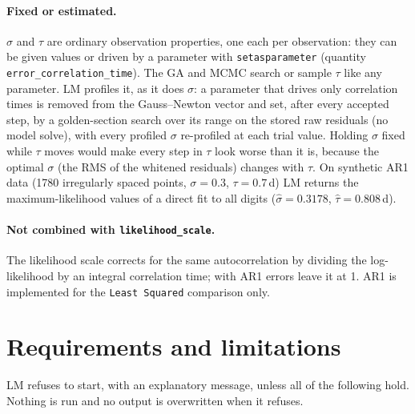 \documentclass[11pt,a4paper]{article}
\newcommand{\code}[1]{\texttt{\small #1}}
\begin{document}
\paragraph{Fixed or estimated.} $\sigma$ and $\tau$ are ordinary observation
properties, one each per observation: they can be given values or driven by a
parameter with \code{setasparameter} (quantity \code{error\_correlation\_time}).
The GA and MCMC search or sample $\tau$ like any parameter. LM profiles it, as it
does $\sigma$: a parameter that drives only correlation times is removed from the
Gauss--Newton vector and set, after every accepted step, by a golden-section
search over its range on the stored raw residuals (no model solve), with every
profiled $\sigma$ re-profiled at each trial value. Holding $\sigma$ fixed while
$\tau$ moves would make every step in $\tau$ look worse than it is, because the
optimal $\sigma$ (the RMS of the whitened residuals) changes with $\tau$. On
synthetic AR1 data (1780 irregularly spaced points, $\sigma=0.3$, $\tau=0.7$\,d)
LM returns the maximum-likelihood values of a direct fit to all digits
($\hat\sigma=0.3178$, $\hat\tau=0.808$\,d).

\paragraph{Not combined with \code{likelihood\_scale}.} The likelihood scale
corrects for the same autocorrelation by dividing the log-likelihood by an
integral correlation time; with AR1 errors leave it at 1. AR1 is implemented for
the \code{Least Squared} comparison only.

\section{Requirements and limitations}

LM refuses to start, with an explanatory message, unless all of the following
hold. Nothing is run and no output is overwritten when it refuses.
\end{document}

